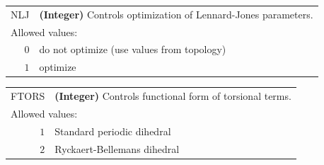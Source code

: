\documentclass[10pt,a4paper,openany]{memoir}
\numberwithin{equation}{section}
\begin{document}
{
\begin{tabular}{r@{ : }l}
\label{descr:nlj}
       NLJ&\textbf{(Integer)} Controls optimization of Lennard-Jones parameters.                                                   \\ 
\multicolumn{2}{l}{Allowed values:} \\ 
     \(0\)&do not optimize (use values from topology)                                                          \\ 
     \(1\)&optimize                                                                                             \\ 
\end{tabular}
\vspace{1ex}
}


{
\begin{tabular}{r@{ : }l}
\label{descr:ftors}
     FTORS&\textbf{(Integer)} Controls functional form of torsional terms.                                                         \\ 
\multicolumn{2}{l}{Allowed values:} \\ 
     \(1\)&Standard periodic dihedral                                                                           \\ 
     \(2\)&Ryckaert-Bellemans dihedral                                                                          \\ 
\end{tabular}
\vspace{1ex}
}
\end{document}
